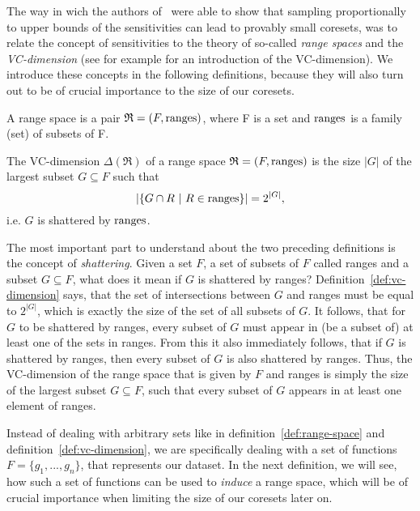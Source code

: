 The way in wich the authors of~\cite{feldman-langberg-coresets}
were able to show that sampling proportionally to upper bounds of the
sensitivities can lead to provably small coresets,
was to relate the concept of sensitivities to
the theory of so-called \textit{range spaces} and
the \textit{VC-dimension}
(see for example \cite{computational-learning-theory} for an
introduction of the VC-dimension).
We introduce these concepts in the following definitions, because
they will also turn out to be of crucial importance to the
size of our coresets.

\begin{definition}
    \label{def:range-space}
    A range space is a pair $\mathfrak{R} = (F, \textup{ranges})$, where F is a set
    and $\textup{ranges}$ is a family (set) of subsets of F.
\end{definition}

\begin{definition}
    \label{def:vc-dimension}
    The VC-dimension $\Delta(\mathfrak{R})$ of a range space
    $\mathfrak{R} = (F, \textup{ranges})$ is
    the size $|G|$ of the largest subset $G \subseteq F$ such that
    \begin{equation*}
        \left| \left\{ G \cap R \ | \ R \in \textup{ranges} \right\} \right|
        = 2^{|G|},
    \end{equation*}
    i.e. $G$ is shattered by $\textup{ranges}$.
\end{definition}

The most important part to understand about the two preceding definitions
is the concept of \textit{shattering}.
Given a set $F$, a set of subsets of $F$ called ranges and a subset
$G \subseteq F$, what does it mean if $G$ is shattered by ranges?
Definition~\ref{def:vc-dimension} says, that the set of intersections
between $G$ and ranges must be equal to $2^{|G|}$, which is exactly
the size of the set of all subsets of $G$.
It follows, that for $G$ to be shattered by ranges, every subset
of $G$ must appear in (be a subset of) at least one of the sets in ranges.
From this it also immediately follows, that if $G$ is shattered by
ranges, then every subset of $G$ is also shattered by ranges.
Thus, the VC-dimension of the range space that is given by $F$ and
ranges is simply the size of the largest subset $G \subseteq F$,
such that every subset of
$G$ appears in at least one element of ranges.

Instead of dealing with arbitrary sets like in
definition~\ref{def:range-space} and definition~\ref{def:vc-dimension},
we are specifically dealing with a set of functions
$F = \{g_1, ..., g_n\}$, that represents our dataset.
In the next definition, we will see, how such a set of functions
can be used to \textit{induce} a range space, which will
be of crucial importance when limiting the size of
our coresets later on.

